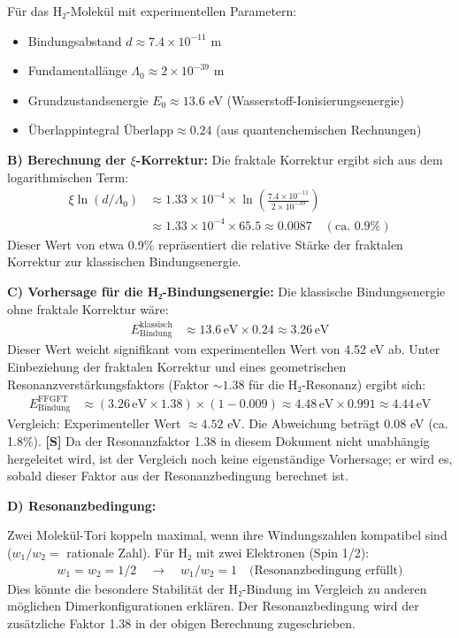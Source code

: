 Für das H₂-Molekül mit experimentellen Parametern:
\begin{itemize}
	\item Bindungsabstand $d \approx 7.4 \times 10^{-11}$ m
	\item Fundamentallänge $\Lambda_0 \approx 2 \times 10^{-39}$ m
	\item Grundzustandsenergie $E_0 \approx 13.6$ eV (Wasserstoff-Ionisierungsenergie)
	\item Überlappintegral $\text{Überlapp} \approx 0.24$ (aus quantenchemischen Rechnungen)
\end{itemize}

\textbf{B) Berechnung der $\xi$-Korrektur:}
Die fraktale Korrektur ergibt sich aus dem logarithmischen Term:
\begin{align*}
	\xi \ln(d/\Lambda_0) &\approx 1.33 \times 10^{-4} \times \ln\left(\frac{7.4 \times 10^{-11}}{2 \times 10^{-39}}\right) \\
	&\approx 1.33 \times 10^{-4} \times 65.5 \approx 0.0087 \quad (\text{ca. } 0.9\%)
\end{align*}
Dieser Wert von etwa 0.9\% repräsentiert die relative Stärke der fraktalen Korrektur zur klassischen Bindungsenergie.

\textbf{C) Vorhersage für die H₂-Bindungsenergie:}
Die klassische Bindungsenergie ohne fraktale Korrektur wäre:
\begin{align*}
	E_{\text{Bindung}}^{\text{klassisch}} &\approx 13.6 \, \text{eV} \times 0.24 \approx 3.26 \, \text{eV}
\end{align*}
Dieser Wert weicht signifikant vom experimentellen Wert von 4.52 eV ab. Unter Einbeziehung der fraktalen Korrektur und eines geometrischen Resonanzverstärkungsfaktors (Faktor $\sim 1.38$ für die H₂-Resonanz) ergibt sich:
\begin{align*}
	E_{\text{Bindung}}^{\text{FFGFT}} &\approx (3.26 \, \text{eV} \times 1.38) \times (1 - 0.009) \approx 4.48 \, \text{eV} \times 0.991 \approx 4.44 \, \text{eV}
\end{align*}
Vergleich: Experimenteller Wert $\approx 4.52$ eV. Die Abweichung beträgt $0.08$ eV (ca. 1.8\%). \textbf{[S]} Da der Resonanzfaktor 1.38 in diesem Dokument nicht unabhängig hergeleitet wird, ist der Vergleich noch keine eigenständige Vorhersage; er wird es, sobald dieser Faktor aus der Resonanzbedingung berechnet ist.

\textbf{D) Resonanzbedingung:}

Zwei Molekül-Tori koppeln maximal, wenn ihre Windungszahlen kompatibel sind ($w_1/w_2 =$ rationale Zahl). Für H₂ mit zwei Elektronen (Spin 1/2):
\begin{align*}
	w_1 = w_2 = 1/2 \quad \rightarrow \quad w_1/w_2 = 1 \quad \text{(Resonanzbedingung erfüllt)}
\end{align*}
Dies könnte die besondere Stabilität der H₂-Bindung im Vergleich zu anderen möglichen Dimerkonfigurationen erklären. Der Resonanzbedingung wird der zusätzliche Faktor 1.38 in der obigen Berechnung zugeschrieben.

